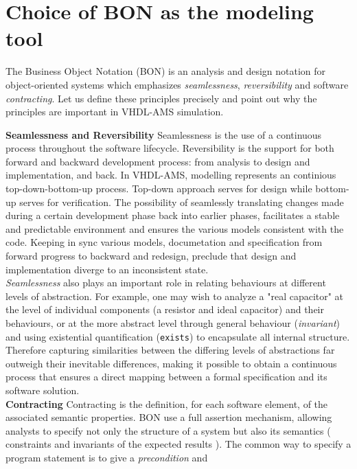 \documentclass{article}
\newcommand{\inv}{\emph{invariant}\xspace}
\begin{document}
\section{Choice of BON as the modeling tool}
\label{sec:choiceobon}
The Business Object Notation (BON) is an analysis and design notation
for object-oriented systems  which emphasizes \emph{seamlessness},\xspace
\emph{reversibility} and software \emph{contracting}.
Let us define these principles precisely and point out why the principles
are important in VHDL-AMS simulation.

\textbf{Seamlessness and  Reversibility} \xspace \xspace
Seamlessness is the use of a continuous process
throughout the software lifecycle. Reversibility is the support for
both forward and backward development process: from analysis to design
and implementation, and back.
In VHDL-AMS, modelling represents an continious top-down-bottom-up
process. Top-down approach serves for design while bottom-up
serves for verification. The possibility of seamlessly translating
changes made during a certain development phase back into earlier phases,
facilitates a stable and predictable environment and ensures the various
models consistent with the code. Keeping in sync various models, documetation
and specification from forward progress to backward and redesign, preclude
that design and implementation diverge to an inconsistent state.\\
\emph{Seamlessness} also plays an important role in relating behaviours at
different levels of abstraction. For example, one may wish to analyze
a "real capacitor" at the level of individual components (a resistor and
ideal capacitor) and their behaviours, or at the more abstract level through
general behaviour (\inv) and using existential quantification (\texttt{exists})
to encapsulate all internal structure. Therefore capturing similarities between
the differing levels of abstractions far outweigh their inevitable differences,
making it possible to obtain a continuous process that ensures a direct mapping
between a formal specification and its software solution.\\
\textbf{Contracting} \xspace \xspace Contracting is the definition, for each
software element, of the associated semantic properties. BON use a full
assertion mechanism, allowing analysts to specify not only the structure of
a system but also its semantics ( constraints and invariants of the expected results ).
The common way to specify a program statement is to give a \emph{precondition} and
\end{document}
